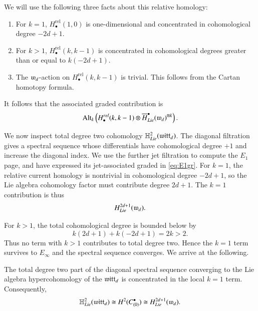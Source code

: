 \documentclass[main.tex]{subfiles}
\begin{document}
We will use the following three facts about this relative homology:
\begin{enumerate}
  \item For $k=1$, $H^{\mathrm{rel}}_\bullet(1,0)$ is one-dimensional and concentrated in cohomological degree $-2d+1$.
  \item For $k>1$, $H^{\mathrm{rel}}_\bullet(k,k-1)$ is concentrated in cohomological degrees greater than or equal to
    $k(-2d+1)$.
  \item The $\mathfrak{w}_d$-action on $H^{\mathrm{rel}}_\bullet(k,k-1)$ is trivial. This follows from the Cartan homotopy formula.
\end{enumerate}
It follows that the associated graded contribution is
\begin{equation}\label{eq:E1gr}
  \operatorname{Alt}_k
  \left(
    H^{rel}_\bullet(k,k-1)
  \otimes
  \overline H^\bullet_{Lie}(\mathfrak{w}_d)^{\otimes k}
  \right).
\end{equation}

We now inspect total degree two cohomology $\mathbb H^2_{Lie}(\mathfrak{witt}_d)$. 
The diagonal filtration gives a spectral sequence whose differentials have
cohomological degree $+1$ and increase the diagonal index.
We use the further jet filtration to compute the $E_1$ page, and have expressed its jet-associated graded in
\eqref{eq:E1gr}. 
For $k=1$, the relative current homology is nontrivial in cohomological degree $-2d+1$,
so the Lie algebra cohomology factor must contribute degree $2d+1$. 
The $k=1$ contribution is thus
\[
  H^{2d+1}_{Lie}(\mathfrak{w}_d).
\]

For $k>1$, the total cohomological degree is bounded below by
\[
  k(2d+1)+k(-2d+1)=2k>2.
\]
Thus no term with $k>1$ contributes to total degree two.
Hence the $k=1$ term survives to $E_\infty$ and the spectral sequence converges.
We arrive at the following.

\begin{theorem}\label{thm:local}
The total degree two part of the diagonal spectral sequence converging to the Lie algebra hypercohomology of the
$\mathfrak{witt}_d$ is concentrated in the local $k=1$ term. Consequently,
\[
  \mathbb H^2_{Lie}(\mathfrak{witt}_d)
  \cong
  H^2(C^\bullet_{(0)})
  \cong
  H^{2d+1}_{Lie}(\mathfrak{w}_d).
\]
\end{theorem}
\end{document}
